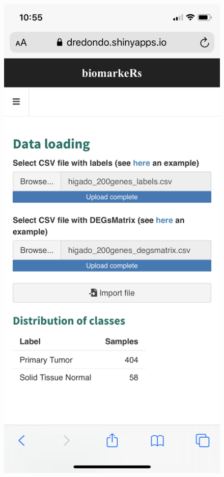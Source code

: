\begin{figure}[H]
	\centering
	\begin{minipage}{.5\textwidth}
		\centering
	\includegraphics[width=.75\textwidth]{figuras/42_app_iphone1.png}
	\end{minipage}%
	\begin{minipage}{.5\textwidth}
		\centering

\end{minipage}
\end{figure}
